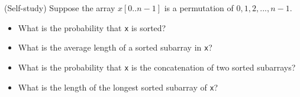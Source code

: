   (Self-study)
  Suppose the array $x[0..n - 1]$ is a permutation of $0, 1, 2, ..., n - 1$.
  \begin{itemize}
  \item What is the probability that \verb!x! is sorted?
  \item What is the average length of a sorted subarray in \verb!x!?
  \item What is the probability that \verb!x! is the concatenation of two sorted subarrays?
  \item What is the length of the longest sorted subarray of \verb!x!?
  \end{itemize}
